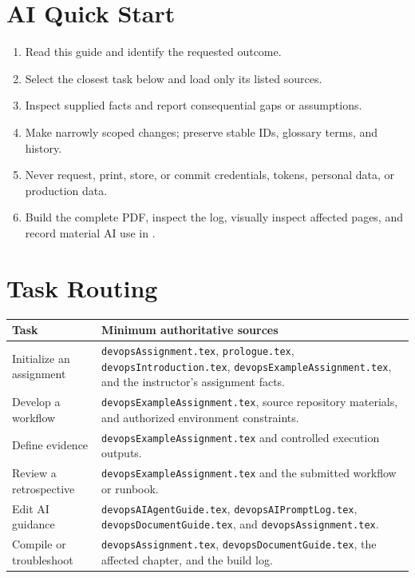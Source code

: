 \section{AI Quick Start}
\begin{enumerate}
\item Read this guide and identify the requested outcome.
\item Select the closest task below and load only its listed sources.
\item Inspect supplied facts and report consequential gaps or assumptions.
\item Make narrowly scoped changes; preserve stable IDs, glossary terms, and history.
\item Never request, print, store, or commit credentials, tokens, personal data, or production data.
\item Build the complete PDF, inspect the log, visually inspect affected pages, and record material AI use in .
\end{enumerate}

\section{Task Routing}
\small
\begin{tabularx}{\linewidth}{L{4.0cm}Y}
\caption{AI Task-Routing Table\label{Table:AITaskRouting}}\\
\toprule \textbf{Task} & \textbf{Minimum authoritative sources}\\ \midrule
Initialize an assignment & \texttt{devopsAssignment.tex}, \texttt{prologue.tex}, \texttt{devopsIntroduction.tex}, \texttt{devopsExampleAssignment.tex}, and the instructor's assignment facts.\\
Develop a workflow & \texttt{devopsExampleAssignment.tex}, source repository materials, and authorized environment constraints.\\
Define evidence & \texttt{devopsExampleAssignment.tex} and controlled execution outputs.\\
Review a retrospective & \texttt{devopsExampleAssignment.tex} and the submitted workflow or runbook.\\
Edit AI guidance & \texttt{devopsAIAgentGuide.tex}, \texttt{devopsAIPromptLog.tex}, \texttt{devopsDocumentGuide.tex}, and \texttt{devopsAssignment.tex}.\\
Compile or troubleshoot & \texttt{devopsAssignment.tex}, \texttt{devopsDocumentGuide.tex}, the affected chapter, and the build log.\\ \bottomrule
\end{tabularx}
\normalsize


